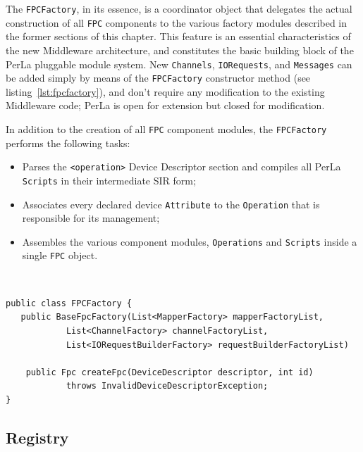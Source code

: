 The \texttt{FPCFactory}, in its essence, is a coordinator object that delegates
the actual construction of all \texttt{FPC} components to the various factory
modules described in the former sections of this chapter. This feature is an
essential characteristics of the new Middleware architecture, and constitutes
the basic building block of the PerLa pluggable module system. New
\texttt{Channels}, \texttt{IORequests}, and \texttt{Messages} can be added
simply by means of the \texttt{FPCFactory} constructor method (see
listing~\ref{lst:fpcfactory}), and don't require any modification to the
existing Middleware code; PerLa is open for extension but closed for
modification.

In addition to the creation of all \texttt{FPC} component modules, the
\texttt{FPCFactory} performs the following tasks:

\begin{itemize}

    \item Parses the \lstinline!<operation>! Device Descriptor section and
        compiles all PerLa \texttt{Scripts} in their intermediate SIR form;

    \item Associates every declared device \texttt{Attribute} to the
        \texttt{Operation} that is responsible for its management;

    \item Assembles the various component modules, \texttt{Operations} and
        \texttt{Scripts} inside a single \texttt{FPC} object.

\end{itemize}

~\\
\lstset{language=java}
\begin{lstlisting}[caption={The FPCFactory class methods},label={lst:fpcfactory}]
public class FPCFactory { 
   public BaseFpcFactory(List<MapperFactory> mapperFactoryList,
            List<ChannelFactory> channelFactoryList,
            List<IORequestBuilderFactory> requestBuilderFactoryList)
    
    public Fpc createFpc(DeviceDescriptor descriptor, int id)
            throws InvalidDeviceDescriptorException;
}
\end{lstlisting}


\subsection{Registry}


